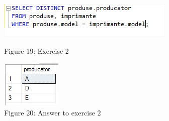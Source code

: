 \begin{enumerate}
\begin{figure}[H]
	\centering
		\includegraphics[width=\linewidth]{screens/22.jpg}
		\caption*{Figure 19: Exercise 2}
		\label{}
	\endminipage\hfill
		\includegraphics[width=\linewidth]{screens/12ans.jpg}
		\caption*{Figure 20: Answer to exercise 2}
	\endminipage
\end{figure}
\end{enumerate}
\bigskip
